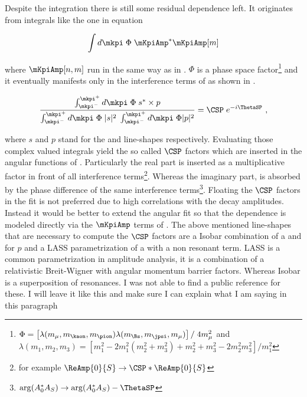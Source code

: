 Despite the \mkpi integration there is still some residual dependence left. It originates from integrals
like the one in equation 

\begin{equation}
  \label{spIntegrals}
  \int d\mkpi \; \Phi \; \mKpiAmp^* \mKpiAmp[m]
\end{equation}

\noindent where $\mKpiAmp[n,m]$ run in the same way as in . $\Phi$ is a phase space 
factor\footnote{$\Phi = \left[ \lambda(m_\mu,m_\kaon,m_\pion) \lambda(m_{\Bs},m_\jpsi,m_\mu) \right] / \; 4 m_\mu^2$  and \\ 
$\lambda(m_1,m_2,m_3) = \left[ m_1^2 - 2m_1^2(m_2^2 + m_3^2) + m_2^2 + m_3^2 - 2m_2^2m_3^2 \right] / m_1^2 $  
} and it eventually manifests only in the \spwave interference terms of  as shown
in .

\begin{equation}
  \label{csp_def}
  \frac{\int_{\mkpi^-}^{\mkpi^+} d\mkpi \; \Phi \; s^* \times p} {\int_{\mkpi^-}^{\mkpi^+} d\mkpi \; \Phi \; |s|^2 \; \int_{\mkpi^-}^{\mkpi^+} d\mkpi \; \Phi |p|^2} = \CSP \; e^{-i\ThetaSP} \ ,
\end{equation}

\noindent where $s$ and $p$ stand for the \swave and \pwave line-shapes respectively. Evaluating those complex valued integrals yield 
the so called $\CSP$ factors which are inserted in the angular functions of . Particularly the real part is inserted
as a multiplicative factor in front of all \spwave interference
terms\footnote{for example $\ReAmp{0}{S} \rightarrow \CSP * \ReAmp{0}{S} $}.
Whereas the imaginary part, is absorbed by the phase difference of the same interference 
terms\footnote{ $\arg(A_0^*A_S) \rightarrow \arg(A_0^*A_S) - \ThetaSP$}. Floating the $\CSP$ factors in the fit is not preferred due
to high correlations with the decay amplitudes. Instead it would be better to extend the angular fit so that the \mkpi dependence 
is modeled directly via the $\mKpiAmp$ terms of . The above mentioned \swave line-shapes that are necessary
to compute the $\CSP$ factors are a Isobar combination of a \KstENT and \KstOFOZ for $p$ and a LASS parametrization of a \KstOFTZ
with a non resonant term. LASS is a common \swave parametrization in amplitude analysis, it is a combination of a relativistic Breit-Wigner
with angular momentum barrier factors. Whereas Isobar is a superposition of resonances. {\color{red}I was not able to find a public reference for these. I
 will leave it like this and make sure I can explain what I am saying in this paragraph }


